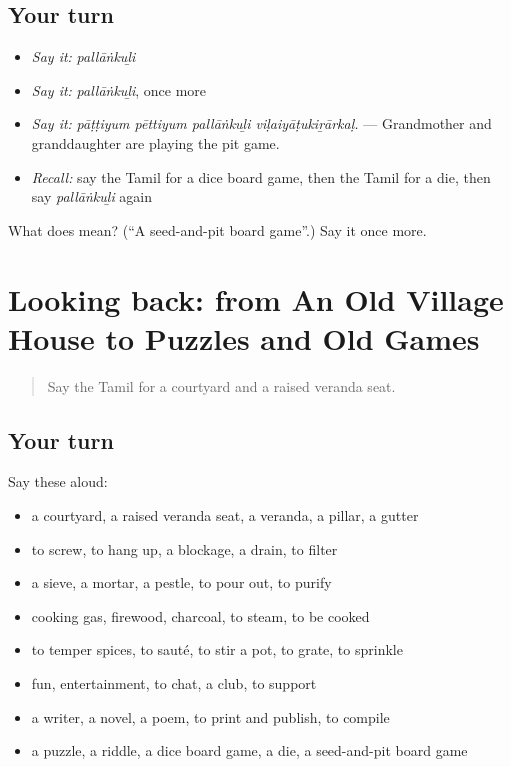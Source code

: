 \subsection*{Your turn}
\begin{itemize}
\raggedright
  \item \emph{Say it:} \emph{pallāṅkuḻi}
  \item \emph{Say it:} \emph{pallāṅkuḻi}, once more
  \item \emph{Say it:} \emph{pāṭṭiyum pēttiyum pallāṅkuḻi viḷaiyāṭukiṟārkaḷ.} — Grandmother and granddaughter are playing the pit game.
  \item \emph{Recall:} say the Tamil for a dice board game, then the Tamil for a die, then say \emph{pallāṅkuḻi} again
\end{itemize}

\begin{tcolorbox}[breakable,colback=teal!4,colframe=teal!35!black,title={Before you move on}]
What does  mean? (\textquotedblleft{}A seed-and-pit board game\textquotedblright{}.) Say it once more.
\end{tcolorbox}
\section[(dialogue)]{Looking back: from An Old Village House to Puzzles and Old Games}

\label{lesson:TA-R529-review-522-529}



\begin{quote}
Say the Tamil for a courtyard and a raised veranda seat.
\end{quote}

\subsection*{Your turn}
Say these aloud:

\begin{itemize}
\raggedright
  \item a courtyard, a raised veranda seat, a veranda, a pillar, a gutter
  \item to screw, to hang up, a blockage, a drain, to filter
  \item a sieve, a mortar, a pestle, to pour out, to purify
  \item cooking gas, firewood, charcoal, to steam, to be cooked
  \item to temper spices, to sauté, to stir a pot, to grate, to sprinkle
  \item fun, entertainment, to chat, a club, to support
  \item a writer, a novel, a poem, to print and publish, to compile
  \item a puzzle, a riddle, a dice board game, a die, a seed-and-pit board game
\end{itemize}

